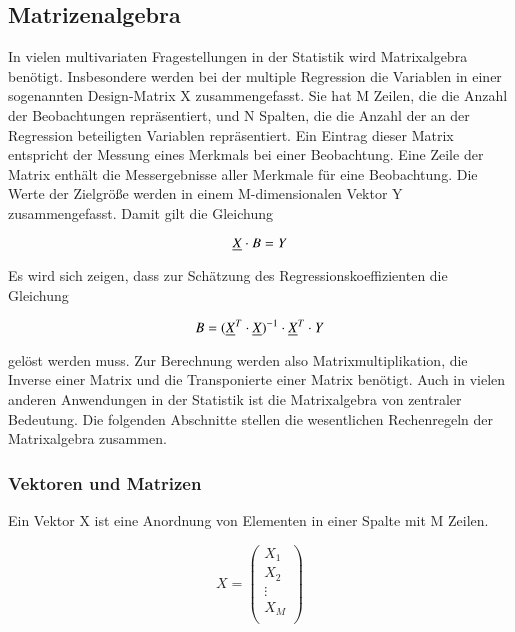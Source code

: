 \subsection{Matrizenalgebra}

\noindent In vielen multivariaten Fragestellungen in der Statistik wird Matrixalgebra ben\"{o}tigt. Insbesondere werden bei der multiple Regression die Variablen in einer sogenannten Design-Matrix X zusammengefasst. Sie hat M Zeilen, die die Anzahl der Beobachtungen repr\"{a}sentiert, und N Spalten, die die Anzahl der an der Regression beteiligten Variablen repr\"{a}sentiert. Ein Eintrag dieser Matrix entspricht der Messung eines Merkmals bei einer Beobachtung. Eine Zeile der Matrix enth\"{a}lt die Messergebnisse aller Merkmale f\"{u}r eine Beobachtung. Die Werte der Zielgr\"{o}{\ss}e werden in einem M-dimensionalen Vektor Y zusammengefasst. Damit gilt die Gleichung

\begin{equation}\label{eq:fifteenone}
\underline{X} \cdot B = Y
\end{equation}

\noindent Es wird sich zeigen, dass zur Sch\"{a}tzung des Regressionskoeffizienten die Gleichung

\begin{equation}\label{eq:fifteentwo}
B = (\underline{X}^{T}\cdot \underline{X})^{-1}\cdot \underline{X}^{T}\cdot Y
\end{equation}

\noindent gel\"{o}st werden muss. Zur Berechnung werden also Matrixmultiplikation, die Inverse einer Matrix und die Transponierte einer Matrix ben\"{o}tigt. Auch in vielen anderen Anwendungen in der Statistik ist die Matrixalgebra von zentraler Bedeutung. Die folgenden Abschnitte stellen die wesentlichen Rechenregeln der Matrixalgebra zusammen.

\subsubsection{Vektoren und Matrizen}

\noindent Ein Vektor X ist eine Anordnung von Elementen in einer Spalte mit M Zeilen. 

\begin{equation}\label{eq:fifteenthree}
X = \begin{pmatrix} 
    X_{1} \\ 
    X_{2} \\
    \vdots\\ 
    X_{M} \\ 
\end{pmatrix}
\end{equation}

